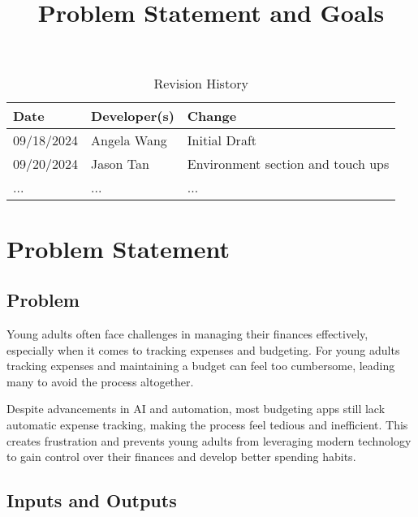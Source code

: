 \documentclass{article}
\title{Problem Statement and Goals\\\progname}
\author{\authname}
\date{}
\begin{document}
\maketitle

\begin{table}[hp]
\caption{Revision History} \label{TblRevisionHistory}
\begin{tabularx}{\textwidth}{llX}
\toprule
\textbf{Date} & \textbf{Developer(s)} & \textbf{Change}\\
\midrule
09/18/2024 & Angela Wang & Initial Draft\\
09/20/2024 & Jason Tan & Environment section and touch ups\\
... & ... & ...\\
\bottomrule
\end{tabularx}
\end{table}

\section{Problem Statement}



\subsection{Problem}

Young adults often face challenges in managing their finances effectively, especially when it comes to tracking expenses and budgeting. For young adults tracking expenses and maintaining a budget can feel too cumbersome, leading many to avoid the process altogether. 

Despite advancements in AI and automation, most budgeting apps still lack automatic expense tracking, making the process feel tedious and inefficient. This creates frustration and prevents young adults from leveraging modern technology to gain control over their finances and develop better spending habits.


\subsection{Inputs and Outputs}
\end{document}
